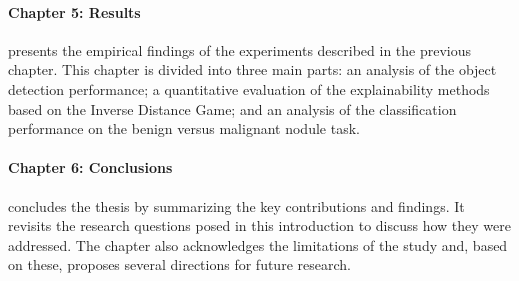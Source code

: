 \paragraph{Chapter 5: Results} presents the empirical findings of the experiments described in the previous chapter. This chapter is divided into three main parts: an analysis of the object detection performance; a quantitative evaluation of the explainability methods based on the Inverse Distance Game; and an analysis of the classification performance on the benign versus malignant nodule task.

\paragraph{Chapter 6: Conclusions} concludes the thesis by summarizing the key contributions and findings. It revisits the research questions posed in this introduction to discuss how they were addressed. The chapter also acknowledges the limitations of the study and, based on these, proposes several directions for future research.